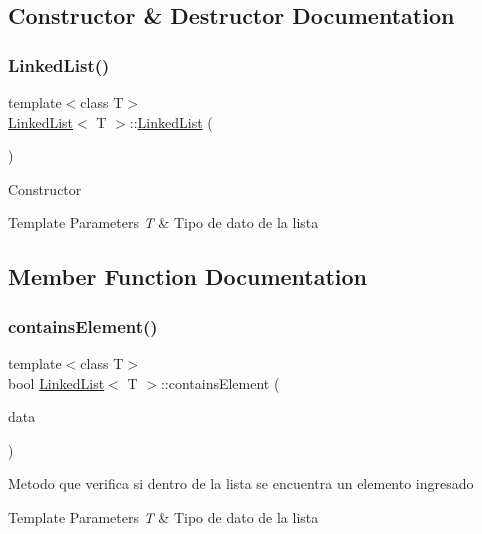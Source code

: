 \subsection{Constructor \& Destructor Documentation}
\mbox{\label{classLinkedList_a3c20fcfec867e867f541061a09fc640c}} 
\subsubsection{\texorpdfstring{Linked\+List()}{LinkedList()}}
{\footnotesize\ttfamily template$<$class T$>$ \\
\hyperlink{classLinkedList}{Linked\+List}$<$ T $>$\+::\hyperlink{classLinkedList}{Linked\+List} (\begin{DoxyParamCaption}{ }\end{DoxyParamCaption})\hspace{0.3cm}{\ttfamily [inline]}}

Constructor 
\begin{DoxyTemplParams}{Template Parameters}
{\em T} & Tipo de dato de la lista \\
\hline
\end{DoxyTemplParams}


\subsection{Member Function Documentation}
\mbox{\label{classLinkedList_a169be5df3e72b1218f8cfdaf2237ac8f}} 
\subsubsection{\texorpdfstring{contains\+Element()}{containsElement()}}
{\footnotesize\ttfamily template$<$class T$>$ \\
bool \hyperlink{classLinkedList}{Linked\+List}$<$ T $>$\+::contains\+Element (\begin{DoxyParamCaption}\item[{T}]{data }\end{DoxyParamCaption})\hspace{0.3cm}{\ttfamily [inline]}}

Metodo que verifica si dentro de la lista se encuentra un elemento ingresado 
\begin{DoxyTemplParams}{Template Parameters}
{\em T} & Tipo de dato de la lista \\
\hline
\end{DoxyTemplParams}

